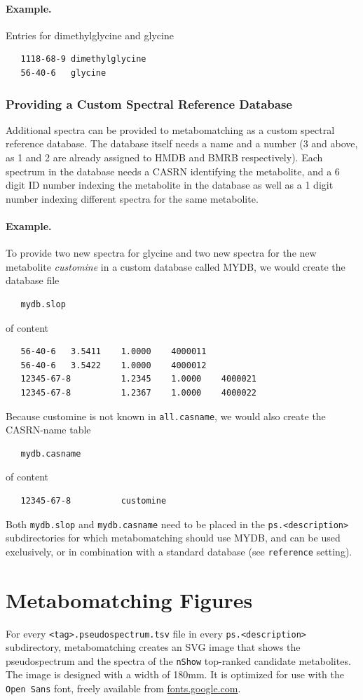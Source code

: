 \documentclass[a4paper,11pt]{article}
\begin{document}
\paragraph{Example.} Entries for dimethylglycine and glycine
\begin{verbatim}
   1118-68-9 dimethylglycine
   56-40-6   glycine
\end{verbatim}
\subsubsection{Providing a Custom Spectral Reference Database}
Additional spectra can be provided to metabomatching as a custom spectral reference database. The database itself needs a name and a number (3 and above, as 1 and 2 are already assigned to HMDB and BMRB respectively). Each spectrum in the database needs a CASRN identifying the metabolite, and a 6 digit ID number indexing the metabolite in the database as well as a 1 digit number indexing different spectra for the same metabolite. 
\paragraph{Example.} To provide two new spectra for glycine and two new spectra for the new metabolite \emph{customine} in a custom database called MYDB, we would create the database file
\begin{verbatim}
   mydb.slop
\end{verbatim}
of content
\begin{verbatim}
   56-40-6   3.5411    1.0000    4000011
   56-40-6   3.5422    1.0000    4000012   
   12345-67-8          1.2345    1.0000    4000021
   12345-67-8          1.2367    1.0000    4000022   
\end{verbatim}
Because customine is not known in \verb|all.casname|, we would also create the CASRN-name table
\begin{verbatim}
   mydb.casname
\end{verbatim}
of content
\begin{verbatim}
   12345-67-8          customine
\end{verbatim}
Both \verb|mydb.slop| and \verb|mydb.casname| need to be placed in the \verb|ps.<description>| subdirectories for which metabomatching should use MYDB, and can be used exclusively, or in combination with a standard database (see \verb|reference| setting).
\section{Metabomatching Figures\label{sec:svg}}
For every \verb|<tag>.pseudospectrum.tsv| file in every \verb|ps.<description>| subdirectory, metabomatching creates an SVG image that shows the pseudospectrum and the spectra of the \verb|nShow| top-ranked candidate metabolites. The image is designed with a width of 180mm. It is optimized for use with the \texttt{Open Sans} font, freely available from \href{https://fonts.google.com/specimen/Open+Sans}{fonts.google.com}.
\end{document}
